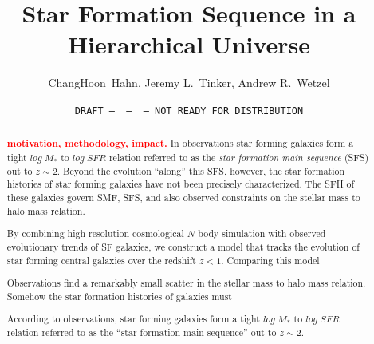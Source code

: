 \documentclass[12pt, letterpaper, preprint, tighten]{aastex}
\newcommand{\todo}[1]{{\bf \textcolor{red}{#1}}}
\begin{document}
\sloppy\sloppypar\frenchspacing

\title{Star Formation Sequence in a Hierarchical Universe} 
\date{\texttt{DRAFT~---~\githash~---~\gitdate~---~NOT READY FOR DISTRIBUTION}}
\author{ChangHoon~Hahn, 
Jeremy L.~Tinker, 
Andrew R.~Wetzel}

\begin{abstract}
    \todo{motivation, methodology, impact.}
    In observations star forming galaxies form a tight $log\;M_*$ to $log\;SFR$ 
    relation referred to as the {\em star formation main sequence} (SFS) out to $z\sim2$. 
    Beyond the evolution ``along'' this SFS, however, the star formation histories of star 
    forming galaxies have not been precisely characterized. 
    The SFH of these galaxies govern SMF, SFS, and also observed constraints on the stellar mass to halo mass
    relation. 

    By combining high-resolution cosmological $N$-body simulation with observed evolutionary 
    trends of SF galaxies, we construct a model that tracks the evolution of star forming 
    central galaxies over the redshift $z < 1$. Comparing this model 

    Observations find a remarkably small scatter in the stellar mass to halo mass relation. 
    Somehow the star formation histories of galaxies must 
    
    According to observations, star forming galaxies form a tight $log\;M_*$ to $log\;SFR$ 
    relation referred to as the ``star formation main sequence'' out to $z\sim2$. 
\end{abstract}
\end{document}
